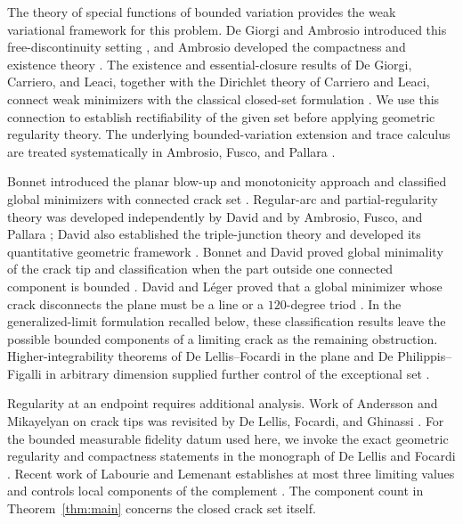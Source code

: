 The theory of special functions of bounded variation provides the weak
variational framework for this problem. De Giorgi and Ambrosio introduced
this free-discontinuity setting \cite{degiorgi_ambrosio1988}, and Ambrosio
developed the compactness and existence theory
\cite{ambrosio1989,ambrosio1990}. The existence and essential-closure results
of De Giorgi, Carriero, and Leaci, together with the Dirichlet theory of
Carriero and Leaci, connect weak minimizers with the classical closed-set
formulation \cite{degiorgi_carriero_leaci1989,carriero_leaci1990}.
We use this connection to establish rectifiability of the given set before
applying geometric regularity theory. The underlying bounded-variation
extension and trace calculus are treated systematically in
Ambrosio, Fusco, and Pallara \cite{ambrosio_fusco_pallara2000}.

Bonnet introduced the planar blow-up and monotonicity approach and
classified global minimizers with connected crack set
\cite[Theorems~2.2, 3.1, and~4.1]{bonnet1996}.
Regular-arc and partial-regularity theory was developed independently by
David and by Ambrosio, Fusco, and Pallara
\cite{david1996,ambrosio_fusco_pallara1997}; David also established the
triple-junction theory and developed its quantitative geometric framework
\cite{david1996,david2005}. Bonnet and David proved global minimality of
the crack tip and classification when the part outside one connected
component is bounded \cite{bonnet_david2001}. David and L\'eger proved
that a global minimizer whose crack disconnects the plane must be a line
or a $120$-degree triod \cite[Corollary~9.16]{david_leger2002}.
In the generalized-limit formulation recalled below, these classification
results leave the possible bounded components of a limiting crack as the
remaining obstruction. Higher-integrability theorems of De Lellis--Focardi
in the plane and De Philippis--Figalli in arbitrary dimension supplied
further control of the exceptional set
\cite{delellis_focardi2013,dephilippis_figalli2014}.

Regularity at an endpoint requires additional analysis. Work of Andersson
and Mikayelyan on crack tips \cite{andersson_mikayelyan2019} was revisited
by De Lellis, Focardi, and Ghinassi
\cite{delellis_focardi_ghinassi2021,delellis_focardi_ghinassi_erratum}.
For the bounded measurable fidelity datum used here, we invoke the exact
geometric regularity and compactness statements in the monograph of
De Lellis and Focardi \cite{delellis_focardi2025}. Recent work of Labourie
and Lemenant establishes at most three limiting values and controls local
components of the complement \cite{labourie_lemenant2026}. The component
count in Theorem~\ref{thm:main} concerns the closed crack set itself.

